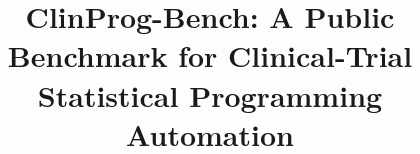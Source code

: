 \documentclass{article}
\title{ClinProg-Bench: A Public Benchmark for Clinical-Trial Statistical Programming Automation}
\begin{document}
\maketitle

\begin{abstract}

\end{abstract}












\appendix


\end{document}
